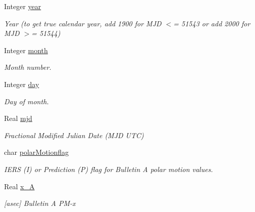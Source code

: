 \begin{DoxyCompactItemize}
\item 
Integer \hyperlink{structlibrary_1_1physics_1_1coord_1_1frame_1_1provider_1_1iers_1_1_finals2000_a_1_1_data_a0f5ac34d8d67c6a4867d3f8668968fa4}{year}
\begin{DoxyCompactList}\small\item\em Year (to get true calendar year, add 1900 for M\+JD $<$= 51543 or add 2000 for M\+JD $>$= 51544) \end{DoxyCompactList}\item 
Integer \hyperlink{structlibrary_1_1physics_1_1coord_1_1frame_1_1provider_1_1iers_1_1_finals2000_a_1_1_data_ae759e695c287fd282994f78b8afd1130}{month}
\begin{DoxyCompactList}\small\item\em Month number. \end{DoxyCompactList}\item 
Integer \hyperlink{structlibrary_1_1physics_1_1coord_1_1frame_1_1provider_1_1iers_1_1_finals2000_a_1_1_data_a4a6b71d0e0a1d3caf04d6f85d4d8e12f}{day}
\begin{DoxyCompactList}\small\item\em Day of month. \end{DoxyCompactList}\item 
Real \hyperlink{structlibrary_1_1physics_1_1coord_1_1frame_1_1provider_1_1iers_1_1_finals2000_a_1_1_data_a4cc02c699f799fd6d3893d072c32bd31}{mjd}
\begin{DoxyCompactList}\small\item\em Fractional Modified Julian Date (M\+JD U\+TC) \end{DoxyCompactList}\item 
char \hyperlink{structlibrary_1_1physics_1_1coord_1_1frame_1_1provider_1_1iers_1_1_finals2000_a_1_1_data_a3de3fabaff5e669e80135ada81245554}{polar\+Motionflag}
\begin{DoxyCompactList}\small\item\em I\+E\+RS (I) or Prediction (P) flag for Bulletin A polar motion values. \end{DoxyCompactList}\item 
Real \hyperlink{structlibrary_1_1physics_1_1coord_1_1frame_1_1provider_1_1iers_1_1_finals2000_a_1_1_data_a5f6be4ccb3d45cad425e1e6dab49b077}{x\+\_\+A}
\begin{DoxyCompactList}\small\item\em \mbox{[}asec\mbox{]} Bulletin A P\+M-\/x \end{DoxyCompactList}\item 

\end{DoxyCompactItemize}
